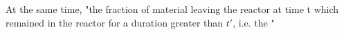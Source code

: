 At the same time, "the fraction of material leaving the reactor at time t which remained in the reactor for a duration greater than $t'$, i.e. the "  